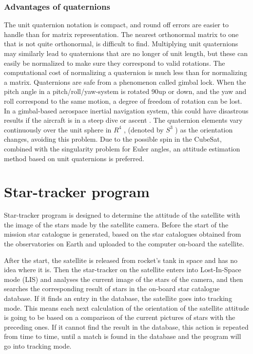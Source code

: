\documentclass[12pt,a4paper,oneside]{article}
\begin{document}
\subsubsection{Advantages of quaternions}
The unit quaternion notation is compact, and round off errors are easier to handle than for matrix representation. The nearest orthonormal matrix to one that is not quite orthonormal, is difficult to find. Multiplying unit quaternions may similarly lead to quaternions that are no longer of unit length, but these can easily be normalized to make sure they correspond to valid rotations. The computational cost of normalizing a quaternion is much less than
for normalizing a matrix.
Quaternions are safe from a phenomenon called gimbal lock. When the pitch angle in a pitch/roll/yaw-system is rotated 90\degree up or down, and the yaw and roll correspond to the same motion, a degree of freedom of rotation can be lost. In a gimbal-based aerospace inertial navigation system, this could have disastrous results if the aircraft is in a steep dive or ascent \citet{shoemake1985animating}. The quaternion elements vary continuously over the unit sphere in $R^4$ , (denoted by $S^3$ ) as the orientation changes, avoiding this problem.
Due to the possible spin in the CubeSat, combined with the singularity problem for Euler angles, an attitude estimation method based on unit quaternions is preferred.

\newpage
\section{Star-tracker program}

Star-tracker program is designed to determine the attitude of the satellite with the image of the stars made by the satellite camera. Before the start of the mission star catalogue is generated, based on the star catalogues obtained from the observatories on Earth and uploaded to the computer on-board the satellite. 

After the start, the satellite is released from rocket's tank in space and has no idea where it is. Then the star-tracker on the satellite enters into Lost-In-Space mode (LIS) and analyses the current image of the stars of the camera, and then searches the corresponding result of stars in the on-board star catalogue database. If it finds an entry in the database, the satellite goes into tracking mode. This means each next calculation of the orientation of the satellite attitude is going to be based on a comparison of the current pictures of stars with the preceding ones. If it cannot find the result in the database, this action is repeated from time to time, until a match is found in the database and the program will go into tracking mode.
\end{document}
